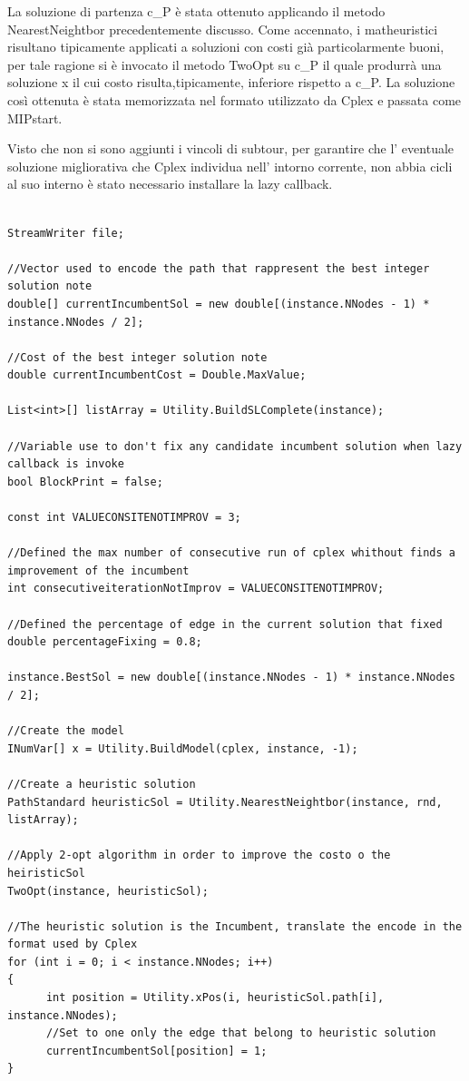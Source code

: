 \documentclass[11pt]{article}
\begin{document}
La soluzione di partenza c_P è stata ottenuto applicando il metodo NearestNeightbor precedentemente discusso. Come accennato, i matheuristici risultano tipicamente applicati a soluzioni  con costi già particolarmente buoni, per tale ragione si è invocato il metodo TwoOpt su c_P il quale produrrà una soluzione x il cui costo risulta,tipicamente, inferiore rispetto a c_P. La soluzione così ottenuta è stata memorizzata nel formato utilizzato da Cplex e passata come MIPstart.

Visto che non si sono aggiunti i vincoli di subtour, per garantire che l' eventuale soluzione migliorativa che Cplex  individua nell' intorno corrente, non abbia cicli al suo interno è stato necessario installare la lazy callback.

\begin{lstlisting}

StreamWriter file;

//Vector used to encode the path that rappresent the best integer solution note
double[] currentIncumbentSol = new double[(instance.NNodes - 1) * instance.NNodes / 2];
            
//Cost of the best integer solution note
double currentIncumbentCost = Double.MaxValue;

List<int>[] listArray = Utility.BuildSLComplete(instance);

//Variable use to don't fix any candidate incumbent solution when lazy callback is invoke
bool BlockPrint = false;

const int VALUECONSITENOTIMPROV = 3;

//Defined the max number of consecutive run of cplex whithout finds a improvement of the incumbent
int consecutiveiterationNotImprov = VALUECONSITENOTIMPROV;

//Defined the percentage of edge in the current solution that fixed 
double percentageFixing = 0.8;

instance.BestSol = new double[(instance.NNodes - 1) * instance.NNodes / 2];

//Create the model
INumVar[] x = Utility.BuildModel(cplex, instance, -1);

//Create a heuristic solution
PathStandard heuristicSol = Utility.NearestNeightbor(instance, rnd, listArray);
            
//Apply 2-opt algorithm in order to improve the costo o the heiristicSol
TwoOpt(instance, heuristicSol);

//The heuristic solution is the Incumbent, translate the encode in the format used by Cplex
for (int i = 0; i < instance.NNodes; i++)
{
      int position = Utility.xPos(i, heuristicSol.path[i], instance.NNodes);
      //Set to one only the edge that belong to heuristic solution
      currentIncumbentSol[position] = 1;
}


\end{lstlisting}
\end{document}
